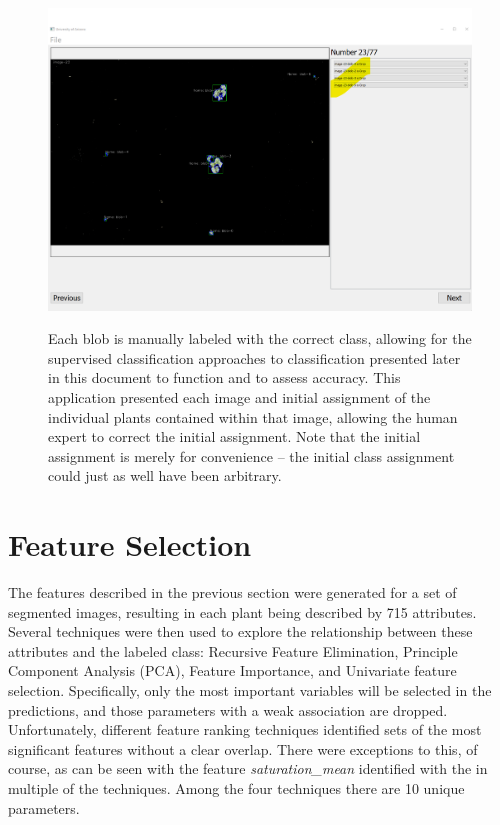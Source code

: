 \documentclass[letterpaper]{article}
\begin{document}
{\begin{figure}[h!]
	\centering
	\includegraphics[width=12cm]{./figures/label-screenshot.png}
	\label{fig:label-screenshot}
	\caption[Screenshot of application for manually labeling blobs]{Each blob is manually labeled with the correct class, allowing for the supervised classification approaches to classification presented later in this document to function and to assess accuracy. This application presented each image and initial assignment of the individual plants contained within that image, allowing the human expert to correct the initial assignment. Note that the initial assignment is merely for convenience -- the initial class assignment could just as well have been arbitrary.}
\end{figure}


\section{Feature Selection}
The features described in the previous section were generated for a set of segmented images, resulting in each plant being described by 715 attributes. Several techniques were then used to explore the relationship between these attributes and the labeled class: Recursive Feature Elimination, Principle Component Analysis (PCA), Feature Importance, and Univariate feature selection.  Specifically, only the most important variables will be selected in the predictions, and those parameters with a weak association are dropped. Unfortunately, different feature ranking techniques identified sets of the most significant features without a clear overlap. There were exceptions to this, of course, as can be seen with the feature \textit{saturation\_mean} identified with the in multiple of the techniques. Among the four techniques there are 10 unique parameters.

}
\end{document}
